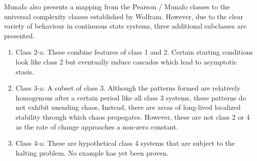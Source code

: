 Munafo also presents a mapping from the Pearson / Munafo classes to the universal complexity classes established by Wolfram. However, due to the clear variety of behaviour in continuous state systems, three additional subclasses are presented.
\begin{enumerate}
    \item Class 2-a: These combine features of class 1 and 2. Certain starting conditions look like class 2 but eventually induce cascades which lead to asymptotic stasis.
    \item Class 3-a: A subset of class 3. Although the patterns formed are relatively homogenous after a certain period like all class 3 systems, these patterns do not exhibit unending chaos. Instead, there are areas of long-lived localized stability through which chaos propogates. However, these are not class 2 or 4 as the rate of change approaches a non-zero constant.
    \item Class 4-a: These are hypothetical class 4 systems that are subject to the halting problem. No example has yet been proven.
\end{enumerate}

